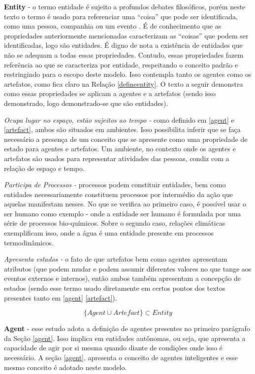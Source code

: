\textbf{Entity} - o termo entidade é sujeito a profundos debates filosóficos, porém neste texto o termo é usado para referenciar uma ``coisa'' que pode ser identificada, como uma pessoa, companhia ou um evento \cite{entity}. É de conhecimento que as propriedades anteriormente mencionadas caracterizam as ``coisas'' que podem ser identificadas, logo são entidades. É digno de nota a existência de entidades que não se adequam a todas essas propriedades. Contudo, essas propriedades fazem referência ao que se caracteriza por entidade, respeitando o conceito padrão \cite{entity} e restringindo para o escopo deste modelo. Isso contempla tanto os agentes como os artefatos, como fica claro na Relação \ref{defineentity}. O texto a seguir demonstra como essas propriedades se aplicam a agentes e a artefatos (sendo isso demonstrado, logo demonstrado-se que são entidades).

\textit{Ocupa lugar no espaço, estão sujeitos ao tempo - } como definido em \ref{agent} e \ref{artefact}, ambos são situados em ambientes. 
Isso possibilita inferir que se faça necessário a presença de um conceito que se apresente como uma propriedade de estado para agentes e artefatos. Um ambiente, no contexto onde os agentes e artefatos são usados para representar atividades das pessoas, condiz com a relação de espaço e tempo. 

\textit{Participa de Processos -} processos podem constituir entidades, bem como entidades necessariamente constituem processos por intermédio da ação que aquelas manifestam nesses. No que se verifica ao primeiro caso, é possível usar o ser humano como exemplo - onde
a entidade ser humano é formulada por uma série de processos bio-químicos. Sobre o segundo caso, relações climáticas exemplificam isso, onde a água é uma entidade presente em processos termodinâmicos. 

\textit{Apresenta estados -} o fato de que artefatos bem como agentes apresentam atributos (que podem mudar e podem assumir diferentes valores no que tange aos eventos externos e internos), então ambos também apresentam a concepção de estados (sendo esse termo usado diretamente em certos pontos dos textos presentes tanto em \ref{agent} \ref{artefact}). 


\begin{equation} \label{defineentity} 
 \{ Agent \cup Artefact \} \subset Entity
\end{equation}

\textbf{Agent} - esse estudo adota a definição de agentes presentes no primeiro parágrafo da Seção \ref{agent}. Isso implica em entidades autônomas, ou seja, que apresenta a capacidade de agir por si mesma quando diante de condições onde isso é necessário. A seção \ref{agent}, apresenta o conceito de agentes inteligentes e esse mesmo conceito é adotado neste modelo. 

